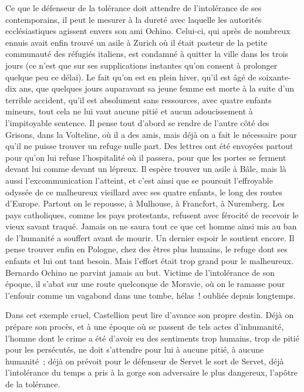 \documentclass[french,twoside]{book} %
\begin{document}
\noindent Ce que le défenseur de la tolérance doit attendre de l’intolérance de ses contemporains, il peut le mesurer à la dureté avec laquelle les autorités ecclésiastiques agissent envers son ami Ochino. Celui-ci, qui après de nombreux ennuis avait enfin trouvé un asile à Zurich où il était pasteur de la petite communauté des réfugiés italiens, est condamné à quitter la ville dans les trois jours (ce n’est que sur ses supplications instantes qu’on consent à prolonger quelque peu ce délai). Le fait qu’on est en plein hiver, qu’il est âgé de soixante-dix ans, que quelques jours auparavant sa jeune femme est morte à la suite d’un terrible accident, qu’il est absolument sans ressources, avec quatre enfants mineurs, tout cela ne lui vaut aucune pitié et aucun adoucissement à l’impitoyable sentence. Il pense tout d’abord se rendre de l’autre côté des Grisons, dans la Volteline, où il a des amis, mais déjà on a fait le nécessaire pour qu’il ne puisse trouver un refuge nulle part. Des lettres ont été envoyées partout pour qu’on lui refuse l’hospitalité où il passera, pour que les portes se ferment devant lui comme devant un lépreux. Il espère trouver un asile à Bâle, mais là aussi l’excommunication l’atteint, et c’est ainsi que se poursuit l’effroyable odyssée de ce malheureux vieillard avec ses quatre enfants, le long des routes d’Europe. Partout on le repousse, à Mulhouse, à Francfort, à Nuremberg. Les pays catholiques, comme les pays protestants, refusent avec férocité de recevoir le vieux savant traqué. Jamais on ne saura tout ce que cet homme ainsi mis au ban de l’humanité a souffert avant de mourir. Un dernier espoir le soutient encore. Il pense trouver enfin en Pologne, chez des êtres plus humains, le refuge dont ses enfants et lui ont tant besoin. Mais l’effort était trop grand pour le malheureux. Bernardo Ochino ne parvint jamais au but. Victime de l’intolérance de son époque, il s’abat sur une route quelconque de Moravie, où on le ramasse pour l’enfouir comme un vagabond dans une tombe, hélas ! oubliée depuis longtemps.\par
Dans cet exemple cruel, Castellion peut lire d’avance son propre destin. Déjà on prépare son procès, et à une époque où se passent de tels actes d’inhumanité, l’homme dont le crime a été d’avoir eu des sentiments trop humains, trop de pitié pour les persécutés, ne doit s’attendre pour lui à aucune pitié, à aucune humanité ; déjà on prévoit pour le défenseur de Servet le sort de Servet, déjà l’intolérance du temps a pris à la gorge son adversaire le plus dangereux, l’apôtre de la tolérance.\par
\end{document}

